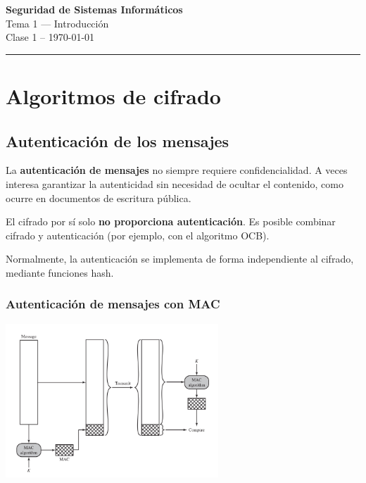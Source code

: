 \documentclass[11pt,a4paper]{article}
\newcommand{\asignatura}{Seguridad de Sistemas Informáticos}
\newcommand{\tema}{Tema 1 — Introducción}
\newcommand{\clase}{Clase 1}
\newcommand{\fecha}{\today}
\begin{document}
\begin{center}
    {\LARGE \textbf{\asignatura}}\\[0.3cm]
    {\large \tema}\\[0.2cm]
    \clase\; -- \fecha
\end{center}
\hrule
\vspace{1em}

\section{Algoritmos de cifrado}
\subsection{Autenticación de los mensajes}

\begin{DefBox}
La \textbf{autenticación de mensajes} no siempre requiere confidencialidad.
A veces interesa garantizar la autenticidad sin necesidad de ocultar el contenido, como ocurre en documentos de escritura pública.
\end{DefBox}

\begin{NotaBox}
El cifrado por sí solo \textbf{no proporciona autenticación}.
Es posible combinar cifrado y autenticación (por ejemplo, con el algoritmo OCB).
\end{NotaBox}

Normalmente, la autenticación se implementa de forma independiente al cifrado, mediante funciones hash.

\subsubsection*{Autenticación de mensajes con MAC}
\begin{center}
    \includegraphics[width=0.6\textwidth]{resources/MAC.png}
\end{center}
\end{document}
